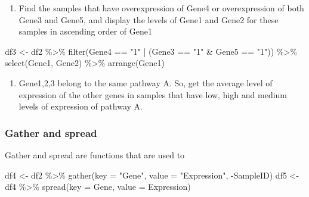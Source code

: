 \documentclass[
]{article}
\newenvironment{Shaded}{\begin{snugshade}}{\end{snugshade}}
\newcommand{\AttributeTok}[1]{\textcolor[rgb]{0.77,0.63,0.00}{#1}}
\newcommand{\FunctionTok}[1]{\textcolor[rgb]{0.00,0.00,0.00}{#1}}
\newcommand{\NormalTok}[1]{#1}
\newcommand{\OtherTok}[1]{\textcolor[rgb]{0.56,0.35,0.01}{#1}}
\newcommand{\SpecialCharTok}[1]{\textcolor[rgb]{0.00,0.00,0.00}{#1}}
\newcommand{\StringTok}[1]{\textcolor[rgb]{0.31,0.60,0.02}{#1}}
\providecommand{\tightlist}{%
  \setlength{\itemsep}{0pt}\setlength{\parskip}{0pt}}
\begin{document}
\begin{enumerate}
\def\labelenumi{\arabic{enumi}.}
\setcounter{enumi}{4}
\tightlist
\item
  Find the samples that have overexpression of Gene4 or overexpression
  of both Gene3 and Gene5, and display the levels of Gene1 and Gene2 for
  these samples in ascending order of Gene1
\end{enumerate}

\begin{Shaded}
\begin{Highlighting}[]
\NormalTok{df3 }\OtherTok{\textless{}{-}}\NormalTok{ df2 }\SpecialCharTok{\%\textgreater{}\%} \FunctionTok{filter}\NormalTok{(Gene4 }\SpecialCharTok{==} \StringTok{"1"} \SpecialCharTok{|}\NormalTok{ (Gene3 }\SpecialCharTok{==} \StringTok{"1"} \SpecialCharTok{\&}\NormalTok{ Gene5 }\SpecialCharTok{==} \StringTok{"1"}\NormalTok{)) }\SpecialCharTok{\%\textgreater{}\%}
    \FunctionTok{select}\NormalTok{(Gene1, Gene2) }\SpecialCharTok{\%\textgreater{}\%} \FunctionTok{arrange}\NormalTok{(Gene1)}
\end{Highlighting}
\end{Shaded}

\begin{enumerate}
\def\labelenumi{\arabic{enumi}.}
\setcounter{enumi}{5}
\tightlist
\item
  Gene1,2,3 belong to the same pathway A. So, get the average level of
  expression of the other genes in samples that have low, high and
  medium levels of expression of pathway A.
\end{enumerate}

\hypertarget{gather-and-spread}{%
\subsubsection{Gather and spread}\label{gather-and-spread}}

Gather and spread are functions that are used to

\begin{Shaded}
\begin{Highlighting}[]
\NormalTok{df4 }\OtherTok{\textless{}{-}}\NormalTok{ df2 }\SpecialCharTok{\%\textgreater{}\%} \FunctionTok{gather}\NormalTok{(}\AttributeTok{key =}  \StringTok{"Gene"}\NormalTok{, }\AttributeTok{value =} \StringTok{"Expression"}\NormalTok{, }\SpecialCharTok{{-}}\NormalTok{SampleID)}
\NormalTok{df5 }\OtherTok{\textless{}{-}}\NormalTok{ df4 }\SpecialCharTok{\%\textgreater{}\%} \FunctionTok{spread}\NormalTok{(}\AttributeTok{key =}\NormalTok{ Gene, }\AttributeTok{value =}\NormalTok{ Expression)}
\end{Highlighting}
\end{Shaded}
\end{document}
